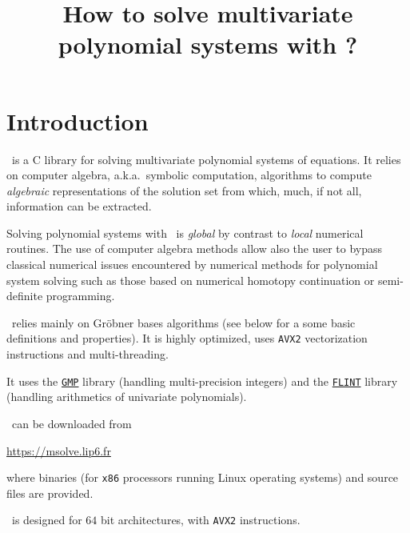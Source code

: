 \documentclass[a4paper,english,11pt]{scrartcl}
\title{How to solve multivariate polynomial systems with {\msolve}?}
\date{}
\theoremstyle{definition}
\theoremstyle{remark}
\begin{document}
\maketitle

\tableofcontents

\section{Introduction}

\msolve~is a C library for solving multivariate polynomial systems of equations.
It relies on computer algebra, a.k.a.\ symbolic computation, algorithms to
compute \emph{algebraic} representations of the solution set from which,
much, if not all, information can be extracted.

Solving polynomial systems with \msolve~is \emph{global} by contrast to
\emph{local} numerical routines. The use of computer algebra methods allow also
the user to bypass classical numerical issues encountered by numerical methods
for polynomial system solving such as those based on numerical homotopy
continuation or semi-definite programming.

\msolve~relies mainly on Gr\"obner bases algorithms (see below for a some basic
definitions and properties). It is highly optimized, uses \texttt{AVX2}
vectorization instructions and multi-threading.

It uses the \href{https://gmplib.org/}{\texttt{GMP}} library (handling
multi-precision integers) and the \href{https://flintlib.org/}{\texttt{FLINT}}
library (handling arithmetics of univariate polynomials).

\msolve~can be downloaded from
\begin{center}
  \url{https://msolve.lip6.fr}
\end{center}
where binaries (for \texttt{x86} processors running Linux operating systems) and
source files are provided.

\msolve~is designed for $64$ bit architectures, with \texttt{AVX2} instructions.
\end{document}
